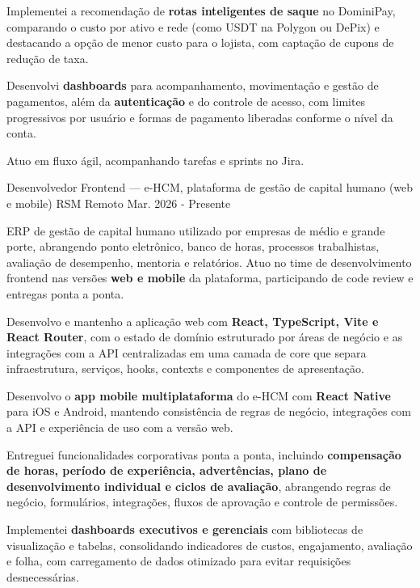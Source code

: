 \begin{cventries}
{\begin{cvitems}
        \item {Implementei a recomendação de \textbf{rotas inteligentes de saque} no DominiPay, comparando o custo por ativo e rede (como USDT na Polygon ou DePix) e destacando a opção de menor custo para o lojista, com captação de cupons de redução de taxa.}
        \item {Desenvolvi \textbf{dashboards} para acompanhamento, movimentação e gestão de pagamentos, além da \textbf{autenticação} e do controle de acesso, com limites progressivos por usuário e formas de pagamento liberadas conforme o nível da conta.}
        \item {Atuo em fluxo ágil, acompanhando tarefas e sprints no Jira.}
      \end{cvitems}
    }

  \cventry
    {Desenvolvedor Frontend --- e-HCM, plataforma de gestão de capital humano (web e mobile)} %
    {RSM} %
    {Remoto} %
    {Mar. 2026 - Presente} %
    {
      \begin{cvitems} %
        \item {ERP de gestão de capital humano utilizado por empresas de médio e grande porte, abrangendo ponto eletrônico, banco de horas, processos trabalhistas, avaliação de desempenho, mentoria e relatórios. Atuo no time de desenvolvimento frontend nas versões \textbf{web e mobile} da plataforma, participando de code review e entregas ponta a ponta.}
        \item {Desenvolvo e mantenho a aplicação web com \textbf{React, TypeScript, Vite e React Router}, com o estado de domínio estruturado por áreas de negócio e as integrações com a API centralizadas em uma camada de core que separa infraestrutura, serviços, hooks, contexts e componentes de apresentação.}
        \item {Desenvolvo o \textbf{app mobile multiplataforma} do e-HCM com \textbf{React Native} para iOS e Android, mantendo consistência de regras de negócio, integrações com a API e experiência de uso com a versão web.}
        \item {Entreguei funcionalidades corporativas ponta a ponta, incluindo \textbf{compensação de horas, período de experiência, advertências, plano de desenvolvimento individual e ciclos de avaliação}, abrangendo regras de negócio, formulários, integrações, fluxos de aprovação e controle de permissões.}
        \item {Implementei \textbf{dashboards executivos e gerenciais} com bibliotecas de visualização e tabelas, consolidando indicadores de custos, engajamento, avaliação e folha, com carregamento de dados otimizado para evitar requisições desnecessárias.}

\end{cvitems}}
\end{cventries}
